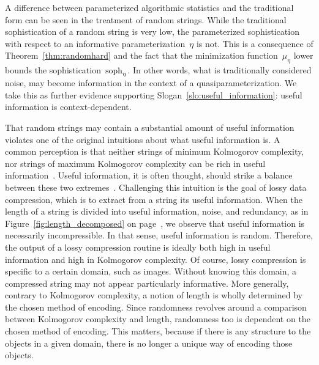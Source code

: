 A difference between parameterized algorithmic statistics and the traditional form can be seen in the treatment of random strings.
While the traditional sophistication of a random string is very low, the parameterized sophistication with respect to an informative parameterization~$\eta$ is not.
This is a consequence of Theorem~\ref{thm:randomhard} and the fact that the minimization function~$\mu_\eta$ lower bounds the sophistication~$\operatorname{soph}_\eta$.
In other words, what is traditionally considered noise, may become information in the context of a quasiparameterization.
We take this as further evidence supporting Slogan~\ref{slo:useful_information}: useful information is context-dependent.

That random strings may contain a substantial amount of useful information violates one of the original intuitions about what useful information is.
A common perception is that neither strings of minimum Kolmogorov complexity, nor strings of maximum Kolmogorov complexity can be rich in useful information~\parencite{adriaans2012facticity}.
Useful information, it is often thought, should strike a balance between these two extremes~\parencite{vitanyi2006meaningful,adriaans2012facticity}.
Challenging this intuition is the goal of lossy data compression, which is to extract from a string its useful information.
When the length of a string is divided into useful information, noise, and redundancy, as in Figure~\ref{fig:length_decomposed} on page~\pageref{fig:length_decomposed}, we observe that useful information is necessarily incompressible.
In that sense, useful information is random.
Therefore, the output of a lossy compression routine is ideally both high in useful information and high in Kolmogorov complexity.
Of course, lossy compression is specific to a certain domain, such as images.
Without knowing this domain, a compressed string may not appear particularly informative.
More generally, contrary to Kolmogorov complexity, a notion of length is wholly determined by the chosen method of encoding.
Since randomness revolves around a comparison between Kolmogorov complexity and length, randomness too is dependent on the chosen method of encoding.
This matters, because if there is any structure to the objects in a given domain, there is no longer a unique way of encoding those objects.
\slogan[\label{slo:random_object}]{There is no such thing as a random object unless the object is a string and nothing but a string.}

